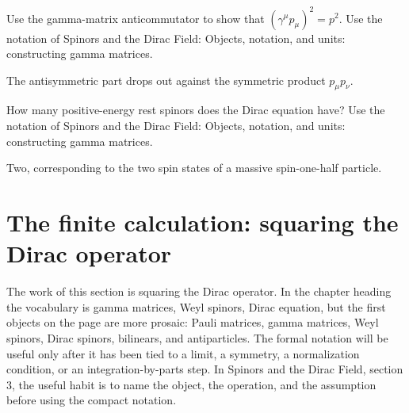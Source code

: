 \begin{exercise}
Use the gamma-matrix anticommutator to show that \((\gamma^\mu p_\mu)^2=p^2\).  Use the notation of Spinors and the Dirac Field: Objects, notation, and units: constructing gamma matrices.
\begin{answer}
The antisymmetric part drops out against the symmetric product \(p_\mu p_\nu\).
\end{answer}
\end{exercise}

\begin{exercise}
How many positive-energy rest spinors does the Dirac equation have?  Use the notation of Spinors and the Dirac Field: Objects, notation, and units: constructing gamma matrices.
\begin{answer}
Two, corresponding to the two spin states of a massive spin-one-half particle.
\end{answer}
\end{exercise}



\section{The finite calculation: squaring the Dirac operator}













The work of this section is squaring the Dirac operator.  In the chapter heading the vocabulary is gamma matrices, Weyl spinors, Dirac equation, but the first objects on the page are more prosaic: Pauli matrices, gamma matrices, Weyl spinors, Dirac spinors, bilinears, and antiparticles.  The formal notation will be useful only after it has been tied to a limit, a symmetry, a normalization condition, or an integration-by-parts step.  In Spinors and the Dirac Field, section 3, the useful habit is to name the object, the operation, and the assumption before using the compact notation.

